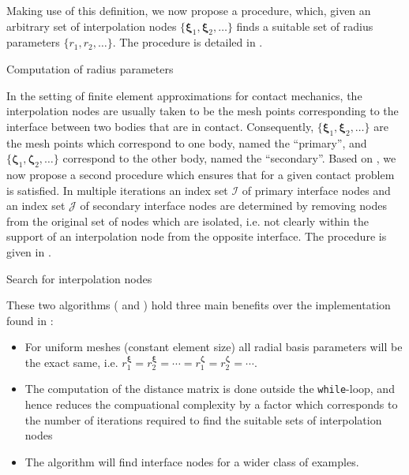 \documentclass[11pt, a4paper]{article}
\begin{document}
Making use of this definition, we now propose a procedure, which, given an arbitrary set of interpolation nodes $\{\boldsymbol{\xi}_1, \boldsymbol{\xi}_2, \dots\}$ finds a suitable set of radius parameters $\{r_1, r_2, \dots \}$. The procedure is detailed in .

\begin{algorithm}[H]
    \caption{Computation of radius parameters}
    
    \label{alg:radiusparameters}
\end{algorithm}

In the setting of finite element approximations for contact mechanics, the interpolation nodes are usually taken to be the mesh points corresponding to the interface between two bodies that are in contact. Consequently, $\{\boldsymbol{\xi}_1, \boldsymbol{\xi}_2, \dots\}$ are the mesh points which correspond to one body, named the \enquote{primary},
and $\{\boldsymbol{\zeta}_1, \boldsymbol{\zeta}_2, \dots\}$ correspond to the other body, named the \enquote{secondary}. Based on , we now propose a second procedure which ensures that for a given contact problem  is satisfied. In multiple iterations an index set $\mathcal{I}$ of primary interface nodes and an index set $\mathcal{J}$ of secondary interface nodes are determined by removing nodes from the original set of nodes which are isolated, i.e. not clearly within the support of an interpolation node from the opposite interface. The procedure is given in .

\begin{algorithm}[H]
    \caption{Search for interpolation nodes}
    
    \label{alg:nodesearch}
\end{algorithm}

These two algorithms ( and ) hold three main benefits over the implementation found in \cite{voet}:

\begin{itemize}
    \item For uniform meshes (constant element size) all radial basis parameters will be the exact same, i.e. $r^{\boldsymbol{\xi}}_1 = r^{\boldsymbol{\xi}}_2 = \cdots = r^{\boldsymbol{\zeta}}_1 = r^{\boldsymbol{\zeta}}_2 = \cdots $.
    \item The computation of the distance matrix is done outside the \texttt{while}-loop, and hence reduces the compuational complexity by a factor which corresponds to the number of iterations required to find the suitable sets of interpolation nodes
    \item The algorithm will find interface nodes for a wider class of examples.
\end{itemize}
\end{document}
